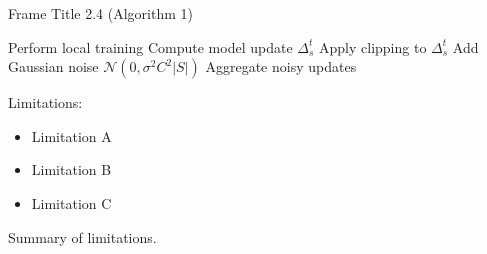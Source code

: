\documentclass{beamer}
\begin{document}
\begin{frame}{Frame Title 2.4 (Algorithm 1)} %
    \begin{algorithm}[H]
        \caption{Placeholder Algorithm 1}
        \begin{algorithmic}[1]\footnotesize
                \State Perform local training
                \State Compute model update $\Delta_s^t$
                \State \colorbox{lightorange}{Apply clipping to $\Delta_s^t$}
                \State \colorbox{lightorange}{Add Gaussian noise $\mathcal{N}(0, \sigma^2 C^2|S|)$} 
            \EndFor
            \State Aggregate noisy updates
        \end{algorithmic}
    \end{algorithm}
    \vspace{-1em}
    \begin{alertblock}{Limitations:}
    \begin{itemize}
            \item Limitation A
            \item Limitation B
            \item Limitation C
    \end{itemize}
    Summary of limitations.
    \end{alertblock}
\end{frame}
\end{document}

